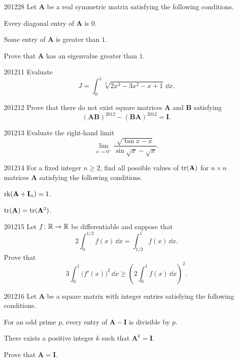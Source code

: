\begin{problem}{2012}{2}{8}
Let $\mathbf A$ be a real symmetric matrix satisfying the following conditions.
\begin{problemclauses}
    \item Every diagonal entry of $\mathbf A$ is $0$.
    \item Some entry of $\mathbf A$ is greater than $1$.
\end{problemclauses}
Prove that $\mathbf A$ has an eigenvalue greater than $1$.
\end{problem}

\begin{problem}{2012}{1}{1}
Evaluate
\[
    J=\int_0^1\sqrt[3]{2x^3-3x^2-x+1}\, \dd x.
\]
\end{problem}

\begin{problem}{2012}{1}{2}
Prove that there do not exist square matrices $\mathbf A$ and $\mathbf B$ satisfying
\[
    (\mathbf A\mathbf B)^{2012}-(\mathbf B\mathbf A)^{2012}=\mathbf I.
\]
\end{problem}

\begin{problem}{2012}{1}{3}
Evaluate the right-hand limit
\[
    \lim_{x\to0^+}
    \frac{\sqrt{\tan x-x}}{\sin\sqrt{x}-\sqrt{x}}.
\]
\end{problem}

\begin{problem}{2012}{1}{4}
For a fixed integer $n\ge2$, find all possible values of $\operatorname{tr}(\mathbf A)$ for $n\times n$ matrices $\mathbf A$ satisfying the following conditions.
\begin{problemclauses}
    \item $\operatorname{rk}(\mathbf A+\mathbf I_n)=1$.
    \item $\operatorname{tr}(\mathbf A)=\operatorname{tr}(\mathbf A^3)$.
\end{problemclauses}
\end{problem}

\begin{problem}{2012}{1}{5}
Let $f\colon\mathbb{R}\to\mathbb{R}$ be differentiable and suppose that
\[
    2\int_0^{1/2}f(x)\, \dd x
    =\int_{1/2}^{1}f(x)\, \dd x.
\]
Prove that
\[
    3\int_0^1\bigl(f'(x)\bigr)^2\, \dd x
    \ge
    \left(2\int_0^1f(x)\, \dd x\right)^2.
\]
\end{problem}

\begin{problem}{2012}{1}{6}
Let $\mathbf A$ be a square matrix with integer entries satisfying the following conditions.
\begin{problemclauses}
    \item For an odd prime $p$, every entry of $\mathbf A-\mathbf I$ is divisible by $p$.
    \item There exists a positive integer $k$ such that $\mathbf A^k=\mathbf I$.
\end{problemclauses}
Prove that $\mathbf A=\mathbf I$.
\end{problem}

